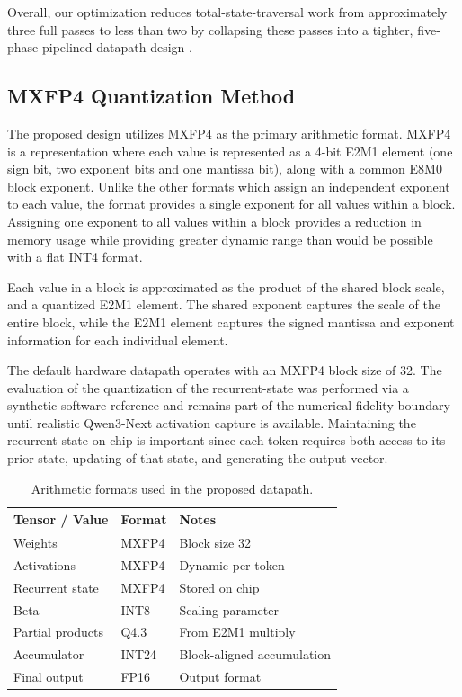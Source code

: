 \documentclass[conference]{IEEEtran}
\begin{document}
Overall, our optimization reduces total-state-traversal work from approximately three full passes to less than two by collapsing these passes into a tighter, five-phase pipelined datapath design \cite{b10}.

\subsection{MXFP4 Quantization Method}
The proposed design utilizes MXFP4 as the primary arithmetic format. MXFP4 is a representation where each value is represented as a 4-bit E2M1 element (one sign bit, two exponent bits and one mantissa bit), along with a common E8M0 block exponent. Unlike the other formats which assign an independent exponent to each value, the format provides a single exponent for all values within a block. Assigning one exponent to all values within a block provides a reduction in memory usage while providing greater dynamic range than would be possible with a flat INT4 format.

Each value in a block is approximated as the product of the shared block scale, and a quantized E2M1 element. The shared exponent captures the scale of the entire block, while the E2M1 element captures the signed mantissa and exponent information for each individual element.

The default hardware datapath operates with an MXFP4 block size of 32. The evaluation of the quantization of the recurrent-state was performed via a synthetic software reference and remains part of the numerical fidelity boundary until realistic Qwen3-Next activation capture is available. Maintaining the recurrent-state on chip is important since each token requires both access to its prior state, updating of that state, and generating the output vector.

\begin{table}[t]
\centering
\caption{Arithmetic formats used in the proposed datapath.}
\label{tab:data_formats}
\begin{tabular}{lll}
\hline
Tensor / Value & Format & Notes \\
\hline
Weights & MXFP4 & Block size 32 \\
Activations & MXFP4 & Dynamic per token \\
Recurrent state & MXFP4 & Stored on chip \\
Beta & INT8 & Scaling parameter \\
Partial products & Q4.3 & From E2M1 multiply \\
Accumulator & INT24 & Block-aligned accumulation \\
Final output & FP16 & Output format \\
\hline
\end{tabular}
\end{table}
\end{document}
